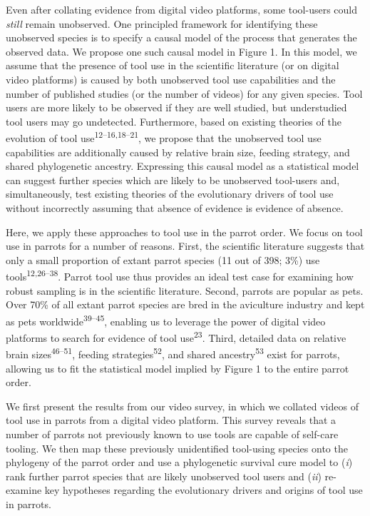 \documentclass[
  man, donotrepeattitle,floatsintext]{apa6}
\begin{document}
Even after collating evidence from digital video platforms, some tool-users
could \emph{still} remain unobserved. One principled framework for identifying these
unobserved species is to specify a causal model of the process that generates
the observed data. We propose one such causal model in Figure 1.
In this model, we assume that the presence of tool use in
the scientific literature (or on digital video platforms) is caused by both
unobserved tool use capabilities and the number of published studies (or the
number of videos) for any given species. Tool users are more likely to be
observed if they are well studied, but understudied tool users may go
undetected. Furthermore, based on existing theories of the evolution of tool use\textsuperscript{12--16,18--21}, we propose
that the unobserved tool use capabilities are additionally caused by relative
brain size, feeding strategy, and shared phylogenetic ancestry. Expressing this
causal model as a statistical model can suggest further species which are likely
to be unobserved tool-users and, simultaneously, test existing theories of the
evolutionary drivers of tool use without incorrectly assuming that absence of
evidence is evidence of absence.

Here, we apply these approaches to tool use in the parrot order. We focus on
tool use in parrots for a number of reasons. First, the scientific literature
suggests that only a small proportion of extant parrot species (11 out of 398;
3\%) use tools\textsuperscript{12,26--38}. Parrot tool
use thus provides an ideal test case for examining how robust sampling is in the
scientific literature. Second, parrots are popular as pets. Over 70\% of all
extant parrot species are bred in the aviculture industry and kept as pets
worldwide\textsuperscript{39--45}, enabling us to leverage the power of digital video platforms to
search for evidence of tool use\textsuperscript{23}. Third, detailed data on relative
brain sizes\textsuperscript{46--51}, feeding strategies\textsuperscript{52}, and shared ancestry\textsuperscript{53} exist for parrots, allowing us to fit the statistical model implied
by Figure 1 to the entire parrot order.

We first present the results from our video survey, in which we collated videos
of tool use in parrots from a digital video platform. This survey reveals that a
number of parrots not previously known to use tools are capable of self-care
tooling. We then map these previously unidentified tool-using species onto the
phylogeny of the parrot order and use a phylogenetic survival cure model to
(\emph{i}) rank further parrot species that are likely unobserved tool users and
(\emph{ii}) re-examine key hypotheses regarding the evolutionary drivers and origins
of tool use in parrots.
\end{document}
